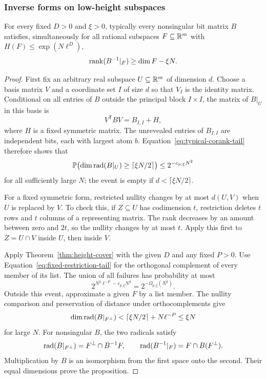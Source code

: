 \subsubsection{Inverse forms on low-height subspaces}

\begin{proposition}
\label{prop:inverse-rank}
For every fixed \(D>0\) and \(\xi>0\), typically every nonsingular bit
matrix \(B\) satisfies, simultaneously for all rational subspaces
\(F\subseteq\mathbb R^m\) with \(H(F)\le\exp(N\ell^D)\),
\[
 \operatorname{rank}(B^{-1}|_F)\ge\dim F-\xi N.
\]
\end{proposition}

\begin{proof}
First fix an arbitrary real subspace \(U\subseteq\mathbb R^m\) of dimension
\(d\). Choose a basis matrix \(V\) and a coordinate set \(I\) of size
\(d\) so that \(V_I\) is the identity matrix. Conditional on all
entries of \(B\) outside the principal block \(I\times I\), the
matrix of \(B|_U\) in this basis is
\[
 V^{\mathsf T}BV=B_{I,I}+H,
\]
where \(H\) is a fixed symmetric matrix. The unrevealed entries of
\(B_{I,I}\) are independent bits, each with largest atom \(b\).
Equation~\eqref{eq:typical-corank-tail} therefore shows that
\begin{equation}\label{eq:fixed-restriction-tail}
 \mathbb P\bigl(\dim\operatorname{rad}(B|_U)\ge\lceil\xi N/2\rceil\bigr)
 \le 2^{-c_{p,\xi}N^2}
\end{equation}
for all sufficiently large \(N\); the event is empty if
\(d<\lceil\xi N/2\rceil\).

For a fixed symmetric form, restricted nullity changes by at most
\(d(U,V)\) when \(U\) is replaced by \(V\). To check this, if
\(Z\subseteq U\) has codimension \(t\), restriction deletes \(t\)
rows and \(t\) columns of a representing matrix. The rank decreases by
an amount between zero and \(2t\), so the nullity changes by at most
\(t\). Apply this first to \(Z=U\cap V\) inside \(U\), then inside
\(V\).

Apply Theorem~\ref{thm:height-cover} with the given \(D\) and any fixed
\(P>0\). Use Equation~\eqref{eq:fixed-restriction-tail} for the
orthogonal complement of every member of its list. The union of all
failures has probability at most
\[
 2^{N^2\ell^{-P}-c_{p,\xi}N^2}=2^{-\Omega_{p,\xi}(N^2)}.
\]
Outside this event, approximate a given \(F\) by a list member. The
nullity comparison and preservation of distance under orthocomplements
give
\[
 \dim\operatorname{rad}(B|_{F^\perp})
 <\lceil\xi N/2\rceil+N\ell^{-P}\le\xi N
\]
for large \(N\). For nonsingular \(B\), the two radicals satisfy
\[
 \operatorname{rad}(B|_{F^\perp})=F^\perp\cap B^{-1}F,
 \qquad
 \operatorname{rad}(B^{-1}|_F)=F\cap B(F^\perp).
\]
Multiplication by \(B\) is an isomorphism from the first space onto
the second. Their equal dimensions prove the proposition.
\end{proof}

